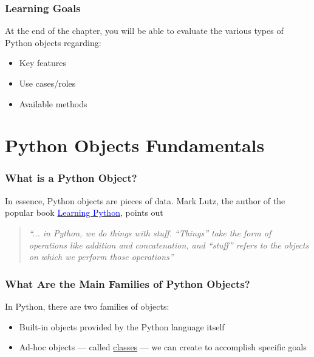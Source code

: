 \documentclass[aspectratio=1610]{beamer}
\begin{document}
\begin{frame}
    \frametitle{Learning Goals}
    At the end of the chapter, you will be able to evaluate the various types of Python objects regarding:
    \begin{itemize}
        \item Key features
        \item Use cases/roles
        \item Available methods
    \end{itemize}
\end{frame}

\section{Python Objects Fundamentals}

\begin{frame}
    \frametitle{What is a Python Object?}
    
    In essence, Python objects are pieces of data. Mark Lutz, the author of the popular book \href{https://www.google.co.uk/books/edition/Learning_Python/4pgQfXQvekcC?hl=en&gbpv=0}{\textcolor{blue}{Learning Python}}, points out

    \vspace{2em}
    
    \begin{quote}
    \textit{``... in Python, we do things with stuff. ``Things'' take the form of operations like addition and concatenation, and ``stuff'' refers to the objects on which we perform those operations''}
    \end{quote}

\end{frame}

\begin{frame}
    \frametitle{What Are the Main Families of Python Objects?}
    In Python, there are two families of objects:
    
    \begin{itemize}
        \item Built-in objects provided by the Python language itself
        \item Ad-hoc objects --- called \href{https://docs.python.org/3/tutorial/classes.html}{classes} --- we can create to accomplish specific goals
    \end{itemize}
    
    \end{frame}
\end{document}
